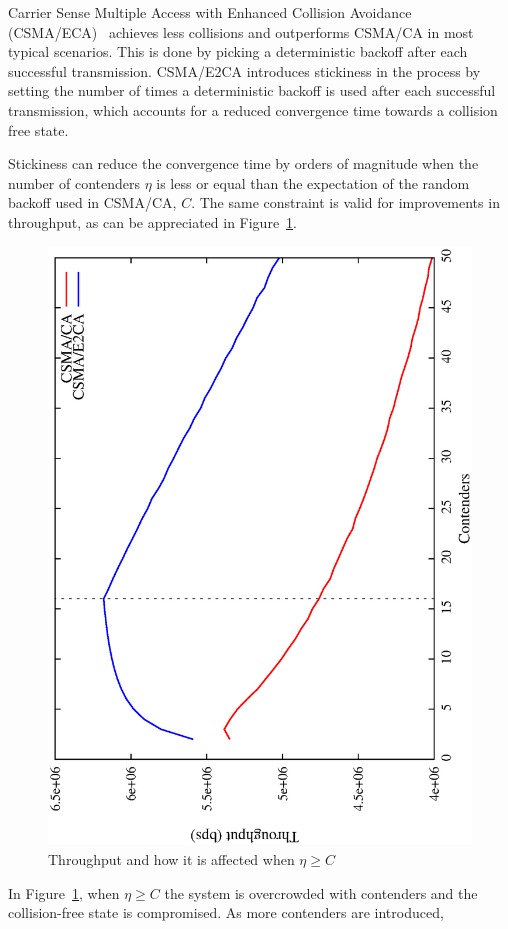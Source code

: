 Carrier Sense Multiple Access with Enhanced Collision Avoidance (CSMA/ECA)~\cite{CSMA_ECA} achieves less collisions and outperforms CSMA/CA in most typical scenarios. This is done by picking a deterministic backoff after each successful transmission. CSMA/E2CA introduces stickiness in the process by setting the number of times a deterministic backoff is used after each successful transmission, which accounts for a reduced convergence time towards a collision free state.

Stickiness can reduce the convergence time by orders of magnitude when the number of contenders $\eta$ is less or equal than the expectation of the random backoff used in CSMA/CA, $C$. The same constraint is valid for improvements in throughput, as can be appreciated in Figure~\ref{fig:throughput}.

\begin{figure}[htbp]
  \centering
  \includegraphics[width=0.7\linewidth, angle = -90]{figures/throughput/throughput.eps}
  \caption{Throughput and how it is affected when $\eta \geq C$
  \label{fig:throughput}}
\end{figure}

In Figure~\ref{fig:throughput}, when $\eta \geq C$ the system is overcrowded with contenders and the collision-free state is compromised. As more contenders are introduced, 